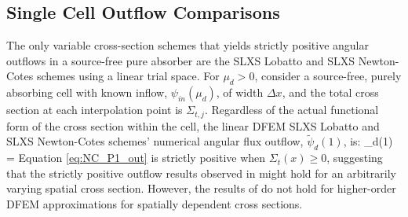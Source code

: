 \subsection{Single Cell Outflow Comparisons}

The only variable cross-section schemes that yields strictly positive angular outflows in a source-free pure absorber are the SLXS Lobatto and SLXS Newton-Cotes schemes using a linear trial space.
For $\mu_d > 0$, consider a source-free, purely absorbing cell with known inflow, $\psi_{in}(\mu_d)$, of width $\Delta x$, and the total cross section at each interpolation point is $\Sigma_{t,j}$.
Regardless of the actual functional form of the cross section within the cell, the linear DFEM SLXS Lobatto and SLXS Newton-Cotes schemes'
numerical angular flux outflow, $\widetilde{\psi}_d(1)$, is:
\benum
\label{eq:NC_P1_out}
\widetilde{\psi}_d(1) =  \pep
\eenum
Equation \ref{eq:NC_P1_out} is strictly positive when $\Sigma_t(x) \geq 0$, suggesting that the strictly positive outflow results observed in \cite{part_1_paper} might hold for an arbitrarily varying spatial cross section.
However, the results of \cite{part_1_paper} do not hold for higher-order DFEM approximations for spatially dependent cross sections.  

